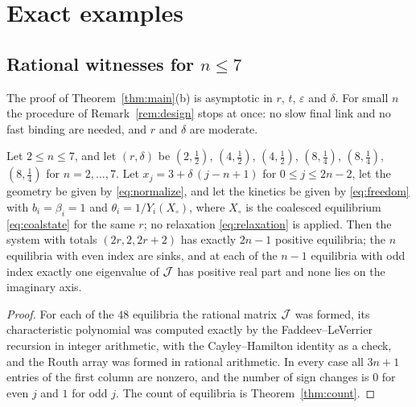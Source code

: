 \section{Exact examples}\label{sec:examples}

\subsection{Rational witnesses for \texorpdfstring{\(n\le7\)}{n at most 7}}
The proof of Theorem~\ref{thm:main}(b) is asymptotic in \(r\), \(t\), \(\varepsilon\) and
\(\delta\). For small \(n\) the procedure of Remark~\ref{rem:design} stops at once: no slow
final link and no fast binding are needed, and \(r\) and \(\delta\) are moderate.

\begin{proposition}\label{prop:witness}
Let \(2\le n\le7\), and let \((r,\delta)\) be \((2,\tfrac12)\), \((4,\tfrac12)\),
\((4,\tfrac12)\), \((8,\tfrac14)\), \((8,\tfrac14)\), \((8,\tfrac14)\) for \(n=2,\dots,7\). Let
\(x_j=3+\delta\,(j-n+1)\) for \(0\le j\le2n-2\), let the geometry be given by
\eqref{eq:normalize}, and let the kinetics be given by \eqref{eq:freedom} with
\(b_i=\beta_i=1\) and \(\theta_i=1/Y_i(X_\circ)\), where \(X_\circ\) is the coalesced
equilibrium \eqref{eq:coalstate} for the same \(r\); no relaxation \eqref{eq:relaxation} is
applied. Then the system with totals \((2r,2,2r+2)\) has exactly \(2n-1\) positive equilibria;
the \(n\) equilibria with even index are sinks, and at each of the \(n-1\) equilibria with odd
index exactly one eigenvalue of \(\mathcal J\) has positive real part and none lies on the imaginary
axis.
\end{proposition}
\begin{proof}
For each of the \(48\) equilibria the rational matrix \(\mathcal J\) was formed, its characteristic
polynomial was computed exactly by the Faddeev--LeVerrier recursion in integer arithmetic, with
the Cayley--Hamilton identity as a check, and the Routh array \cite[Ch.~XV]{Gantmacher} was
formed in rational arithmetic. In every case all \(3n+1\) entries of the first column are
nonzero, and the number of sign changes is \(0\) for even \(j\) and \(1\) for odd \(j\). The
count of equilibria is Theorem~\ref{thm:count}.
\end{proof}

